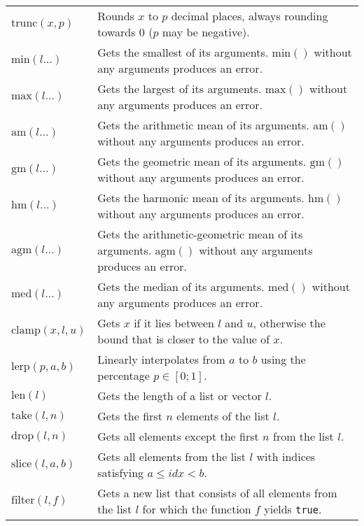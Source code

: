 \documentclass[10pt]{article}
\newcommand{\tabgap}{\vspace{3mm}\\}
\begin{document}
\begin{longtable}{p{}p{}}
        $ \mathrm{trunc}(x, p) $                   & Rounds $ x $ to $ p $ decimal places, always rounding towards $ 0 $ ($ p $ may be negative). \tabgap
        $ \mathrm{min}(l\dots) $                   & Gets the smallest of its arguments. $ \mathrm{min}() $ without any arguments produces an error. \\
        $ \mathrm{max}(l\dots) $                   & Gets the largest of its arguments. $ \mathrm{max}() $ without any arguments produces an error. \\
        $ \mathrm{am}(l\dots) $                    & Gets the arithmetic mean of its arguments. $ \mathrm{am}() $ without any arguments produces an error. \\
        $ \mathrm{gm}(l\dots) $                    & Gets the geometric mean of its arguments. $ \mathrm{gm}() $ without any arguments produces an error. \\
        $ \mathrm{hm}(l\dots) $                    & Gets the harmonic mean of its arguments. $ \mathrm{hm}() $ without any arguments produces an error. \\
        $ \mathrm{agm}(l\dots) $                   & Gets the arithmetic-geometric mean of its arguments. $ \mathrm{agm}() $ without any arguments produces an error. \\
        $ \mathrm{med}(l\dots) $                   & Gets the median of its arguments. $ \mathrm{med}() $ without any arguments produces an error. \tabgap
        $ \mathrm{clamp}(x, l, u) $                & Gets $ x $ if it lies between $ l $ and $ u $, otherwise the bound that is closer to the value of $ x $. \\
        $ \mathrm{lerp}(p, a, b) $                 & Linearly interpolates from $ a $ to $ b $ using the percentage $ p \in [0;1] $. \tabgap
        $ \mathrm{len}(l) $                        & Gets the length of a list or vector $ l $. \\
        $ \mathrm{take}(l, n) $                    & Gets the first $ n $ elements of the list $ l $. \\
        $ \mathrm{drop}(l, n) $                    & Gets all elements except the first $ n $ from the list $ l $. \\
        $ \mathrm{slice}(l, a, b) $                & Gets all elements from the list $ l $ with indices satisfying $ a \leq idx < b $. \\
        $ \mathrm{filter}(l, f) $                  & Gets a new list that consists of all elements from the list $ l $ for which the function $ f $ yields \verb|true|. \\

\end{longtable}
\end{document}
